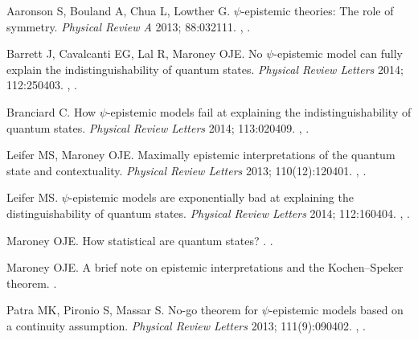 \documentclass[DIV=calc,fontsize=12pt]{scrartcl} %
\theoremstyle{definition}
\theoremstyle{plain}
\begin{document}
\begin{thebibliography}{10}
Aaronson S, Bouland A, Chua L, Lowther G.
\newblock $\psi$-epistemic theories: The role of symmetry.
\newblock \emph{Physical Review A} 2013; 88:032111.
\newblock \href {http://arxiv.org/abs/1303.2834} {},
\href {http://dx.doi.org/10.1103/PhysRevA.88.032111}
{}.

Barrett J, Cavalcanti EG, Lal R, Maroney OJE.
\newblock No $\psi$-epistemic model can fully explain the indistinguishability
of quantum states.
\newblock \emph{Physical Review Letters} 2014; 112:250403.
\newblock \href {http://arxiv.org/abs/1310.8302} {},
\href {http://dx.doi.org/10.1103/PhysRevLett.112.250403}
{}.

Branciard C.
\newblock How $\psi$-epistemic models fail at explaining the
indistinguishability of quantum states.
\newblock \emph{Physical Review Letters} 2014; 113:020409.
\newblock \href {http://arxiv.org/abs/1407.3005} {},
\href {http://dx.doi.org/10.1103/PhysRevLett.113.020409}
{}.

Leifer MS, Maroney OJE.
\newblock Maximally epistemic interpretations of the quantum state and
contextuality.
\newblock \emph{Physical Review Letters} 2013; 110(12):120401.
\newblock \href {http://arxiv.org/abs/1208.5132} {},
\href {http://dx.doi.org/10.1103/PhysRevLett.110.120401}
{}.

Leifer MS.
\newblock $\psi$-epistemic models are exponentially bad at explaining the
distinguishability of quantum states.
\newblock \emph{Physical Review Letters} 2014; 112:160404.
\newblock \href {http://arxiv.org/abs/1401.7996} {},
\href {http://dx.doi.org/10.1103/PhysRevLett.112.160404}
{}.

Maroney OJE.
\newblock How statistical are quantum states?
.
\newblock \href {http://arxiv.org/abs/1207.6906} {}.

Maroney OJE.
\newblock A brief note on epistemic interpretations and the Kochen--Speker theorem.
\newblock \href {http://arxiv.org/abs/1207.7192} {}.

Patra MK, Pironio S, Massar S.
\newblock No-go theorem for $\psi$-epistemic models based on a continuity
assumption.
\newblock \emph{Physical Review Letters} 2013; 111(9):090402.
\newblock \href {http://arxiv.org/abs/1211.1179} {},
\href {http://dx.doi.org/10.1103/PhysRevLett.111.090402}
{}.


\end{thebibliography}
\end{document}
